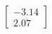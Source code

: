 \documentclass[preview]{standalone}
\begin{document}
\begin{align*}
\begin{bmatrix} -3.14 \\ 2.07 \end{bmatrix}
\end{align*}
\end{document}
